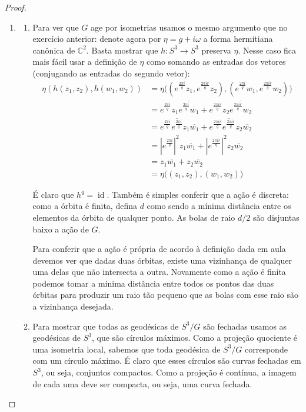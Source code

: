 \begin{proof}\leavevmode
\begin{enumerate}[label=(\alph*)]
\item 
	\begin{enumerate}[label=(\roman*)]
	\item Para ver que \(G\) age por isometrias usamos o mesmo argumento que no exercício anterior: denote agora por \(\eta=g+i \omega\) a forma hermitiana canônica de \(\mathbb{C}^2\). Basta mostrar que \(h:S^3 \to S^3\) preserva \(\eta\). Nesse caso fica mais fácil usar a definição de \(\eta\) como somando as entradas dos vetores (conjugando as entradas do segundo vetor):
		\begin{align*}
		\eta(h(z_1,z_2),h(w_1,w_2))&=\eta\Big((e^{\frac{2\pi i}{q}}z_1, e^{\frac{2\pi ir}{q}}z_2), (e^{\frac{2\pi i}{q}}w_1, e^{\frac{2\pi ir}{q}}w_2)\Big) \\
&=e^{\frac{2\pi i}{q}} z_1 \overline{e^{\frac{2\pi i}{q}}w_1}+e^{\frac{2\pi ir}{q}}z_2\overline{e^{\frac{2\pi ir}{q}}w_2}\\
&=e^{\frac{2\pi i}{q}}\overline{e^{\frac{2\pi i}{q}}}z_1\overline{w_1} + e^{\frac{2\pi i r}{q}}\overline{e^{\frac{2\pi i r}{q}}}z_2\overline{w_2}\\
&=\left| e^{\frac{2\pi i}{q}} \right|^2z_1\overline{w_1}+\left| e^{\frac{2\pi ir}{q}} \right|^2z_2\overline{w_2}\\
&=z_1\overline{w_1}+z_2\overline{w_2}\\
&=\eta\Big((z_1,z_2),(w_1,w_2)\Big)
		\end{align*}


		É claro que \(h^q=\operatorname{id}\). Também é simples conferir que a ação é discreta: como a órbita é finita, defina \(d\) como sendo a mínima distância entre os elementos da órbita de qualquer ponto. As bolas de raio \(d/2\) são disjuntas baixo a ação de  \(G\).

		Para conferir que a ação é própria de acordo à definição dada em aula devemos ver que dadas duas órbitas, existe uma vizinhança de qualquer uma delas que não intersecta a outra. Novamente como a ação é finita podemos tomar a mínima distância entre todos os pontos das duas órbitas para produzir um raio tão pequeno que as bolas com esse raio são a vizinhança desejada.

\item Para mostrar que todas as geodésicas de \(S^3/G\) são fechadas usamos as geodésicas de \(S^3\), que são círculos máximos. Como a projeção quociente é uma isometria local, sabemos que toda geodésica de \(S^3/G\) corresponde com um círculo máximo. É claro que esses círculos são curvas fechadas em \(S^3\), ou seja, conjuntos compactos. Como a projeção é contínua, a imagem de cada uma deve ser compacta, ou seja, uma curva fechada.


\end{enumerate}
\end{enumerate}
\end{proof}
